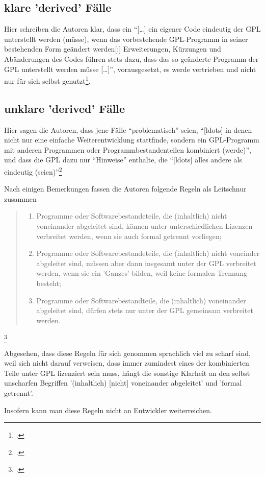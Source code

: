 \documentclass[DIV=calc,BCOR=5mm,11pt,headings=small,oneside,abstract=true, toc=bib]{scrartcl}
\begin{document}
\subsection{klare 'derived' Fälle}

Hier schreiben die Autoren klar, dass ein \enquote{[\ldots] ein eigener Code
eindeutig der GPL unterstellt werden (müsse), wenn das vorbestehende
GPL-Programm in seiner bestehenden Form geändert werden[:] Erweiterungen,
Kürzungen und Abänderungen des Codes führen stets dazu, dass das so geänderte
Programm der GPL unterstellt werden müsse [\ldots]}, vorausgesetzt, es
werde vertrieben und nicht nur für sich selbst
genutzt\footcite[cf.][66]{ifross2005a}.

\subsection{unklare 'derived' Fälle}

Hier sagen die Autoren, dass jene Fälle \enquote{problematisch} seien,
\enquote{[ldots]  in denen nicht nur eine einfache Weiterentwicklung stattfinde,
sondern ein GPL-Programm mit anderen Programmen oder Programmbestandenteilen
kombiniert (werde)}, und dass die GPL dazu nur \enquote{Hinweise}
enthalte, die \enquote{[ldots] alles andere als eindeutig
(seien)}\footcite[cf.][67]{ifross2005a}

Nach einigen Bemerkungen fassen die Autoren folgende Regeln als Leitschnur
zusammen

\begin{quote}
\begin{enumerate}
  \item Programme oder Softwarebestandeteile, die (inhaltlich) nicht voneinander
  abgeleitet sind, können unter unterschiedlichen Lizenzen verbreitet werden,
  wenn sie auch formal getrennt vorliegen;
  \item Programme oder Softwarebestandeteile, die (inhaltlich) nicht voneinder
  abgeleitet sind, müssen aber dann insgesamt unter der GPL verbreitet werden,
  wenn sie ein 'Ganzes' bilden, weil keine formalen Trennung besteht;
  \item Programme oder Softwarebestandteile, die (inhaltlich) voneinander
  abgeleitet sind, dürfen stets nur unter der GPL gemeinsam verbreitet werden.
\end{enumerate}
\end{quote}\footcite[cf.][69]{ifross2005a}

Abgesehen, dass diese Regeln für sich genommen sprachlich viel zu scharf sind,
weil sich nicht darauf verweisen, dass immer zumindest eines der kombinierten
Teile unter GPL lizenziert sein muss, hängt die sonstige Klarheit an den
selbst unscharfen Begriffen '(inhaltlich) [nicht] voneinander abgeleitet' und
'formal getrennt'.

Insofern kann man diese Regeln nicht an Entwickler weiterreichen.

\small

\end{document}

